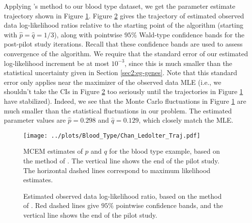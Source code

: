 \documentclass[11pt, oneside]{article}   	%
\begin{document}
Applying \citeauthor{Cha95}'s method to our blood type dataset, we get the parameter estimate trajectory shown in Figure \ref{fig:blood_CL_MCEM_estimates}. Figure \ref{fig:blood_CL_MCEM_likelihoods} gives the trajectory of estimated observed data log-likelihood ratios relative to the starting point of the algorithm (starting with $\hat{p} = \hat{q} = 1/3$), along with pointwise $95\%$ Wald-type confidence bands for the post-pilot study iterations. Recall that these confidence bands are used to assess convergence of the algorithm. We require that the standard error of our estimated log-likelihood increment be at most $10^{-3}$, since this is much smaller than the statistical uncertainty given in Section \ref{sec2:eg-genes}. Note that this standard error only applies near the maximizer of the observed data MLE (i.e., we shouldn't take the CIs in Figure \ref{fig:blood_CL_MCEM_likelihoods} too seriously until the trajectories in Figure \ref{fig:blood_CL_MCEM_estimates} have stabilized). Indeed, we see that the Monte Carlo fluctuations in Figure \ref{fig:blood_CL_MCEM_estimates} are much smaller than the statistical fluctuations in our problem. The estimated parameter values are $\hat{p} = 0.298$ and $\hat{q} = 0.129$, which closely match the MLE.

\begin{figure}
    \centering
    \caption{MCEM estimates of $p$ and $q$ for the blood type example, based on the method of \citet{Cha95}. The vertical line shows the end of the pilot study. The horizontal dashed lines correspond to maximum likelihood estimates.}
    \texttt{[image: ../plots/Blood\_Type/Chan\_Ledolter\_Traj.pdf]} 
    \label{fig:blood_CL_MCEM_estimates}
\end{figure}

\begin{figure}
    \centering
    \caption{Estimated observed data log-likelihood ratio, based on the method of \citet{Cha95}. Red dashed lines give $95\%$ pointwise confidence bands, and the vertical line shows the end of the pilot study.}

    
    \label{fig:blood_CL_MCEM_likelihoods}
\end{figure}
\end{document}
